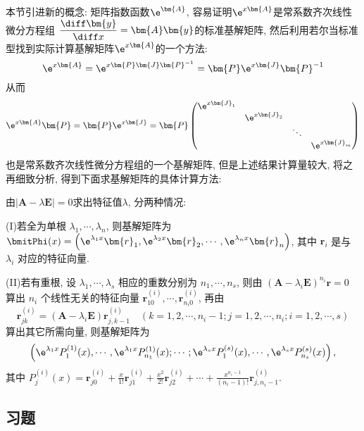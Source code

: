 本节引进新的概念: 矩阵指数函数$\e^{\bm{A}}$, 
容易证明$\e^{x\bm{A}}$是常系数齐次线性微分方程组
$\displaystyle\frac{\diff\bm{y}}{\diff x}=\bm{A}\bm{y}$的标准基解矩阵, 
然后利用若尔当标准型找到实际计算基解矩阵$\e^{x\bm{A}}$的一个方法:
\[\e^{x\bm{A}}=\e^{x\bm{P}\bm{J}\bm{P}^{-1}}=\bm{P}\e^{x\bm{J}}\bm{P}^{-1}\]
从而\[\e^{x\bm{A}}\bm{P}=\bm{P}\e^{x\bm{J}}=\bm{P}\begin{pmatrix}
\e^{x\bm{J}_1}&&&\\&\e^{x\bm{J}_2}&&\\&&\ddots&\\&&&\e^{x\bm{J}_m}
\end{pmatrix}\]
也是常系数齐次线性微分方程组的一个基解矩阵, 但是上述结果计算量较大, 将之再细致分析, 得到下面求基解矩阵的具体计算方法:

由$|\bm{A}-\lambda\bm{E}|=0$求出特征值$\lambda$, 分两种情况:

(I)若全为单根 $\lambda_1,\cdots,\lambda_n$, 
则基解矩阵为 $\bmitPhi(x)=\left(\e^{\lambda_1x}\bm{r}_1,\e^{\lambda_2x}\bm{r}_2,\cdots,\e^{\lambda_nx}\bm{r}_n\right)$, 
其中 $\bm{r}_i$ 是与 $\lambda_i$ 对应的特征向量.

(II)若有重根, 设 $\lambda_1,\cdots,\lambda_s$ 相应的重数分别为 $n_1,\cdots,n_s$, 
则由 $(\bm{A}-\lambda_i\bm{E})^{n_i}\bm{r}=0$ 
算出 $n_i$ 个线性无关的特征向量 $\bm{r}_{10}^{(i)},\cdots,\bm{r}_{n_i0}^{(i)}$, 再由
\[\bm{r}_{jk}^{(i)}=(\bm{A}-\lambda_i\bm{E})\bm{r}_{j,k-1}^{(i)}
\quad (k=1,2,\cdots,n_i-1;j=1,2,\cdots,n_i;i=1,2,\cdots,s)\]
算出其它所需向量, 则基解矩阵为
\[\left(\e^{\lambda_1x}P_1^{(1)}(x),\cdots,\e^{\lambda_1x}P_{n_1}^{(1)}(x);\cdots;
  \e^{\lambda_sx}P_1^{(s)}(x),\cdots,\e^{\lambda_sx}P_{n_s}^{(s)}(x)\right),\]
其中 $\displaystyle P_j^{(i)}(x)=\bm{r}_{j0}^{(i)}+\frac{x}{1!}\bm{r}_{j1}^{(i)}+\frac{x^2}{2!}\bm{r}_{j2}^{(i)}+\cdots+\frac{x^{n_i-1}}{(n_i-1)!}\bm{r}_{j,n_i-1}^{(i)}$.



\subsection{习题}



